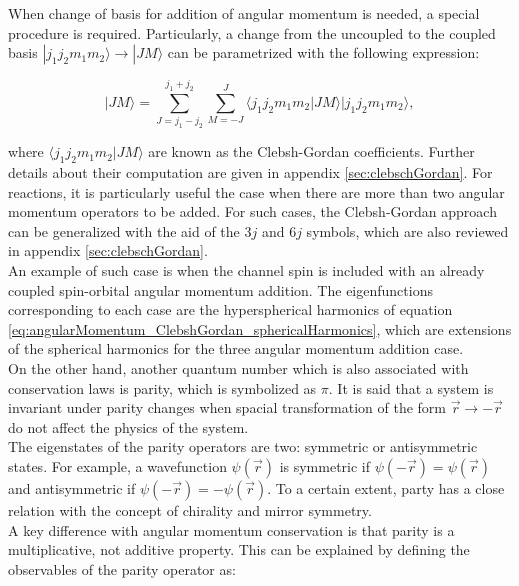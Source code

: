 \documentclass[openany]{book}
\begin{document}
When change of basis for addition of angular momentum is needed, a special procedure is required. Particularly, a change from the uncoupled to the coupled basis $|j_1j_2m_1m_2 \rangle \rightarrow |JM \rangle$ can be parametrized with the following expression:

\begin{equation} \label{eq:angularMomentum_coupledBaseExpansion}
 |JM \rangle = \sum_{J = j_1 - j_2}^{j_1 + j_2} \sum_{M = -J}^{J} {\langle j_1j_2m_1m_2 | JM \rangle  |j_1j_2m_1m_2\rangle},
\end{equation}

where $\langle j_1j_2m_1m_2 | JM \rangle $ are known as the Clebsh-Gordan coefficients. Further details about their computation are given in appendix \ref{sec:clebschGordan}. For reactions, it is particularly useful the case when there are more than two angular momentum operators to be added. For such cases, the Clebsh-Gordan approach can be generalized with the aid of the $3j$ and $6j$ symbols, which are also reviewed in appendix \ref{sec:clebschGordan}. \\

An example of such case is when the channel spin is included with an already coupled spin-orbital angular momentum addition. The eigenfunctions corresponding to each case are the hyperspherical harmonics of equation \ref{eq:angularMomentum_ClebshGordan_sphericalHarmonics}, which are extensions of the spherical harmonics for the three angular momentum addition case. \\

On the other hand, another quantum number which is also associated with conservation laws is parity, which is symbolized as $\pi$. It is said that a system is invariant under parity changes when spacial transformation of the form $\vec r \rightarrow - \vec r$ do not affect the physics of the system. \\

The eigenstates of the parity operators are two: symmetric  or antisymmetric states. For example, a wavefunction $\psi(\vec r)$ is symmetric if $\psi(-\vec r) = \psi(\vec r) $ and antisymmetric if $\psi(-\vec r) = -\psi(\vec r) $. To a certain extent, party has a close relation with the concept of chirality and mirror symmetry. \\

A key difference with angular momentum conservation is that parity is a multiplicative, not additive property. This can be explained by defining the observables of the parity operator as:  
\end{document}
